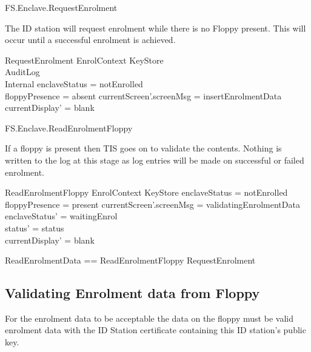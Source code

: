 \begin{traceunit}{FS.Enclave.RequestEnrolment}
\end{traceunit}


The ID station will request enrolment while there is no Floppy
present. This will occur until a successful enrolment is achieved.

\begin{schema}{RequestEnrolment}
        EnrolContext
\also
        \Xi KeyStore
\\      \Xi AuditLog
\\      \Xi Internal
\where
        enclaveStatus = notEnrolled
\\      floppyPresence = absent
\also
        currentScreen'.screenMsg = insertEnrolmentData
\also
        currentDisplay' = blank
\end{schema}

\begin{traceunit}{FS.Enclave.ReadEnrolmentFloppy}
\end{traceunit}

If a floppy is present then TIS goes on to validate the
contents. Nothing is written to the log at this stage as log entries
will be made on successful or failed enrolment.

\begin{schema}{ReadEnrolmentFloppy}
        EnrolContext
\also
        \Xi KeyStore
\where
        enclaveStatus = notEnrolled
\\      floppyPresence = present
\also
        currentScreen'.screenMsg = validatingEnrolmentData 
\also
        enclaveStatus' = waitingEnrol     
\\      status' = status
\\      currentDisplay' = blank                         
\end{schema}

\begin{zed}
        ReadEnrolmentData == ReadEnrolmentFloppy \lor RequestEnrolment
\end{zed}

\subsection{Validating Enrolment data from Floppy}

For the enrolment data to be acceptable the data on the floppy must be
valid enrolment data with the ID Station certificate containing this
ID station's public key. 

